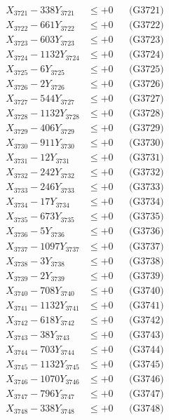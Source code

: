 \documentclass[a4paper,10pt]{article}
\begin{document}
{\begin{align}
\allowbreak
X_{3721} - 338Y_{3721} &\leq +0 && \text{(G3721)} \\
X_{3722} - 661Y_{3722} &\leq +0 && \text{(G3722)} \\
X_{3723} - 603Y_{3723} &\leq +0 && \text{(G3723)} \\
X_{3724} - 1132Y_{3724} &\leq +0 && \text{(G3724)} \\
X_{3725} - 6Y_{3725} &\leq +0 && \text{(G3725)} \\
X_{3726} - 2Y_{3726} &\leq +0 && \text{(G3726)} \\
X_{3727} - 544Y_{3727} &\leq +0 && \text{(G3727)} \\
X_{3728} - 1132Y_{3728} &\leq +0 && \text{(G3728)} \\
X_{3729} - 406Y_{3729} &\leq +0 && \text{(G3729)} \\
X_{3730} - 911Y_{3730} &\leq +0 && \text{(G3730)} \\
\allowbreak
X_{3731} - 12Y_{3731} &\leq +0 && \text{(G3731)} \\
X_{3732} - 242Y_{3732} &\leq +0 && \text{(G3732)} \\
X_{3733} - 246Y_{3733} &\leq +0 && \text{(G3733)} \\
X_{3734} - 17Y_{3734} &\leq +0 && \text{(G3734)} \\
X_{3735} - 673Y_{3735} &\leq +0 && \text{(G3735)} \\
X_{3736} - 5Y_{3736} &\leq +0 && \text{(G3736)} \\
X_{3737} - 1097Y_{3737} &\leq +0 && \text{(G3737)} \\
X_{3738} - 3Y_{3738} &\leq +0 && \text{(G3738)} \\
X_{3739} - 2Y_{3739} &\leq +0 && \text{(G3739)} \\
X_{3740} - 708Y_{3740} &\leq +0 && \text{(G3740)} \\
\allowbreak
X_{3741} - 1132Y_{3741} &\leq +0 && \text{(G3741)} \\
X_{3742} - 618Y_{3742} &\leq +0 && \text{(G3742)} \\
X_{3743} - 38Y_{3743} &\leq +0 && \text{(G3743)} \\
X_{3744} - 703Y_{3744} &\leq +0 && \text{(G3744)} \\
X_{3745} - 1132Y_{3745} &\leq +0 && \text{(G3745)} \\
X_{3746} - 1070Y_{3746} &\leq +0 && \text{(G3746)} \\
X_{3747} - 796Y_{3747} &\leq +0 && \text{(G3747)} \\
X_{3748} - 338Y_{3748} &\leq +0 && \text{(G3748)} \\

\end{align}}
\end{document}
